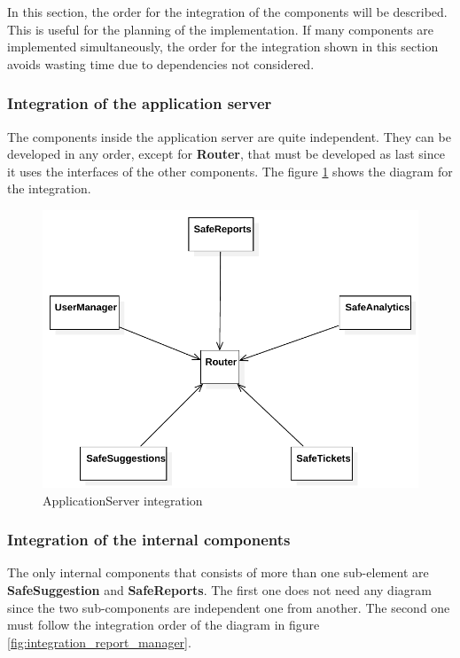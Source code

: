 \documentclass[./main.tex]{subfiles}
\begin{document}
In this section, the order for the integration of the components will be
described. This is useful for the planning of the implementation. If many
components are implemented simultaneously, the order for the integration shown
in this section avoids wasting time due to dependencies not considered.

\subsubsection{Integration of the application server}

The components inside the application server are quite independent. They can be
developed in any order, except for \textbf{Router}, that must be developed as
last since it uses the interfaces of the other components. The figure
\ref{fig:integration_router} shows the diagram for the integration.

\begin{figure}[H]
\centering
\includegraphics[width=\textwidth]{resources/integration_diagrams/integration_router}
\caption{ApplicationServer integration}
\label{fig:integration_router}
\end{figure}

\subsubsection{Integration of the internal components}

The only internal components that consists of more than one sub-element are
\textbf{SafeSuggestion} and \textbf{SafeReports}. The first one does not need
any diagram since the two sub-components are independent one from another. The
second one must follow the integration order of the diagram in figure
\ref{fig:integration_report_manager}.
\end{document}
